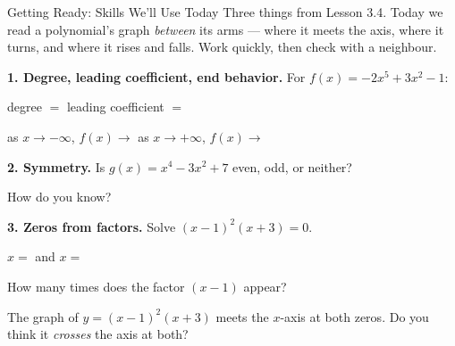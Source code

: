 \documentclass[12pt]{article}
\begin{document}

\vspace{0.10in}

\begin{notesbox}{Getting Ready: Skills We'll Use Today}
Three things from Lesson 3.4. Today we read a polynomial's graph \emph{between} its arms ---
where it meets the axis, where it turns, and where it rises and falls. Work quickly, then check
with a neighbour.

\vspace{8pt}
\textbf{1. Degree, leading coefficient, end behavior.} For $f(x)=-2x^5+3x^2-1$:

\vspace{4pt}
\hspace*{1.5em}degree $=$ \blank{1.0cm} \qquad leading coefficient $=$ \blank{1.0cm}

\vspace{6pt}
\hspace*{1.5em}as $x\to-\infty$, $f(x)\to$ \blank{1.4cm} \qquad as $x\to+\infty$, $f(x)\to$ \blank{1.4cm}

\vspace{10pt}
\textbf{2. Symmetry.} Is $g(x)=x^4-3x^2+7$ even, odd, or neither? \blank{2.0cm}

\vspace{4pt}
\hspace*{1.5em}How do you know? \blank{6.6cm}

\vspace{10pt}
\textbf{3. Zeros from factors.} Solve $(x-1)^2(x+3)=0$.

\vspace{4pt}
\hspace*{1.5em}$x=$ \blank{1.0cm} \quad and \quad $x=$ \blank{1.0cm}

\vspace{6pt}
\hspace*{1.5em}How many times does the factor $(x-1)$ appear? \blank{1.0cm}

\vspace{6pt}
\hspace*{1.5em}The graph of $y=(x-1)^2(x+3)$ meets the $x$-axis at both zeros. Do you think it
\emph{crosses} the axis at both? \blank{2.4cm}
\end{notesbox}
\end{document}
